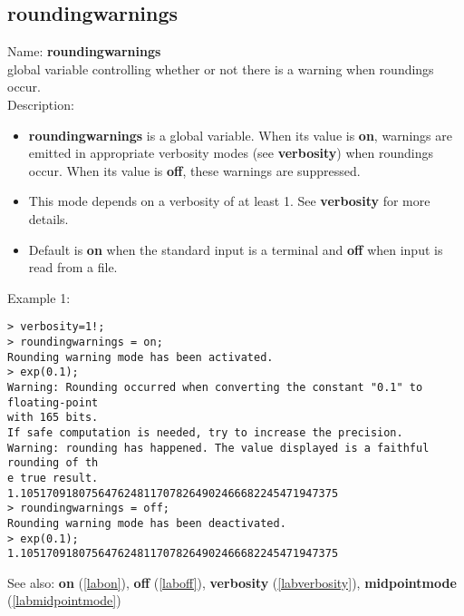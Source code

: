 \subsection{roundingwarnings}
\label{labroundingwarnings}
\noindent Name: \textbf{roundingwarnings}\\
global variable controlling whether or not there is a warning when roundings occur.\\

\noindent Description: \begin{itemize}

\item \textbf{roundingwarnings} is a global variable. When its value is \textbf{on}, warnings are
   emitted in appropriate verbosity modes (see \textbf{verbosity}) when roundings
   occur.  When its value is \textbf{off}, these warnings are suppressed.

\item This mode depends on a verbosity of at least 1. See
   \textbf{verbosity} for more details.

\item Default is \textbf{on} when the standard input is a terminal and
   \textbf{off} when \sollya input is read from a file.
\end{itemize}
\noindent Example 1: 
\begin{center}\begin{minipage}{15cm}\begin{Verbatim}[frame=single]
> verbosity=1!;
> roundingwarnings = on;
Rounding warning mode has been activated.
> exp(0.1);
Warning: Rounding occurred when converting the constant "0.1" to floating-point 
with 165 bits.
If safe computation is needed, try to increase the precision.
Warning: rounding has happened. The value displayed is a faithful rounding of th
e true result.
1.1051709180756476248117078264902466682245471947375
> roundingwarnings = off;
Rounding warning mode has been deactivated.
> exp(0.1);
1.1051709180756476248117078264902466682245471947375
\end{Verbatim}
\end{minipage}\end{center}
See also: \textbf{on} (\ref{labon}), \textbf{off} (\ref{laboff}), \textbf{verbosity} (\ref{labverbosity}), \textbf{midpointmode} (\ref{labmidpointmode})
